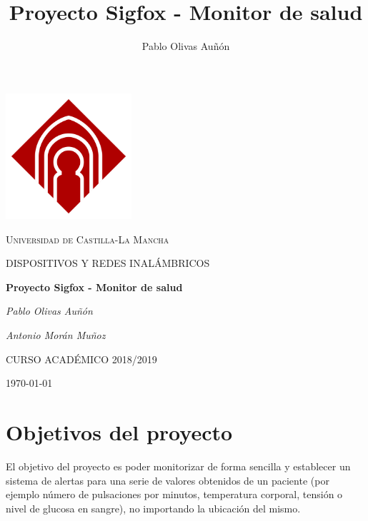 \documentclass[12pt,a4paper]{article}
\author{Pablo Olivas Auñón}
\title{Proyecto Sigfox - Monitor de salud}
\begin{document}
\begin{titlepage}
\thispagestyle{empty}
\centering
	\includegraphics[width=0.35\textwidth]{castilla.png}\par\vspace{1cm}
	{\scshape\LARGE Universidad de Castilla-La Mancha \par}
	\vspace{1cm}
	{\scshape\Large DISPOSITIVOS Y REDES INALÁMBRICOS\par}
	\vspace{1.5cm}
	{\huge\bfseries Proyecto Sigfox - Monitor de salud\par}
	\vspace{2cm}
	{\Large\itshape Pablo Olivas Auñón\par}
	{\Large\itshape Antonio Morán Muñoz\par}

	\vfill

	{CURSO ACADÉMICO 2018/2019}
	\vfill
	{\large \today\par}
\end{titlepage}

\thispagestyle{empty}
\tableofcontents
\newpage

\thispagestyle{empty}
\listoffigures
\newpage

\thispagestyle{empty}
\listoftables
\newpage

\section{Objetivos del proyecto}
El objetivo del proyecto es poder monitorizar de forma sencilla y establecer un sistema de alertas para una serie de valores obtenidos de un paciente (por ejemplo número de pulsaciones por minutos, temperatura corporal, tensión o nivel de glucosa en sangre), no importando la ubicación del mismo.
\end{document}
